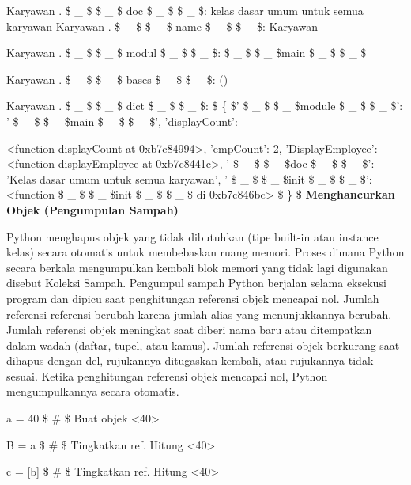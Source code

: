 \begin{12pt}
\begin{12pt}
\begin{12pt}
\begin{12pt}
\begin{12pt}
\begin{12pt}
\begin{12pt}
\begin{12pt}
\begin{12pt}
\begin{12pt}
\begin{12pt}
\begin{12pt}
\begin{12pt}
\begin{12pt}
\begin{12pt}
\begin{12pt}
\vspace{12pt}
\noindent 
Karyawan . \$  \_  \$ \$  \_  \$ doc \$  \_  \$ \$  \_  \$: kelas dasar umum untuk semua karyawan 
\noindent 
Karyawan . \$  \_  \$ \$  \_  \$ name \$  \_  \$ \$  \_  \$: Karyawan \par
\noindent 
Karyawan . \$  \_  \$ \$  \_  \$ modul \$  \_  \$ \$  \_  \$:  \$  \_  \$ \$  \_  \$main \$  \_  \$ \$  \_  \$ \par
\noindent 
Karyawan . \$  \_  \$ \$  \_  \$ bases \$  \_  \$ \$  \_  \$: () \par
\noindent 
Karyawan . \$  \_  \$ \$  \_  \$ dict \$  \_  \$ \$  \_  \$:  \$  \{  \$' \$  \_  \$ \$  \_  \$module \$  \_  \$ \$  \_  \$': ' \$  \_  \$ \$  \_  \$main \$  \_  \$ \$  \_  \$', 'displayCount': \par
\noindent 
<function displayCount at 0xb7c84994>, 'empCount': 2, 
\noindent 
'DisplayEmployee': <function displayEmployee at 0xb7c8441c>, 
\noindent 
' \$  \_  \$ \$  \_  \$doc \$  \_  \$ \$  \_  \$': 'Kelas dasar umum untuk semua karyawan', 
\noindent 
' \$  \_  \$ \$  \_  \$init \$  \_  \$ \$  \_  \$': <function  \$  \_  \$ \$  \_  \$init \$  \_  \$ \$  \_  \$ di 0xb7c846bc> \$  \}  \$ 
\vspace{12pt}
\noindent 
{\fontsize{14pt}{14pt}\selectfont \textbf{Menghancurkan Objek (Pengumpulan Sampah)} \\} \par
\vspace{12pt}
Python menghapus objek yang tidak dibutuhkan (tipe built-in atau instance kelas) secara otomatis untuk membebaskan ruang memori. Proses dimana Python secara berkala mengumpulkan kembali blok memori yang tidak lagi digunakan disebut Koleksi Sampah. Pengumpul sampah Python berjalan selama eksekusi program dan dipicu saat penghitungan referensi objek mencapai nol. Jumlah referensi referensi berubah karena jumlah alias yang menunjukkannya berubah. Jumlah referensi objek meningkat saat diberi nama baru atau ditempatkan dalam wadah (daftar, tupel, atau kamus). Jumlah referensi objek berkurang saat dihapus dengan del, rujukannya ditugaskan kembali, atau rujukannya tidak sesuai. Ketika penghitungan referensi objek mencapai nol, Python mengumpulkannya secara otomatis. \par
\vspace{12pt}
\noindent 
a = 40  \$  \#  \$ Buat objek <40> \par
\noindent 
B = a  \$  \#  \$ Tingkatkan ref. Hitung <40> \par
\noindent 
c = [b]  \$  \#  \$ Tingkatkan ref. Hitung <40> \par

\end{12pt}
\end{12pt}
\end{12pt}
\end{12pt}
\end{12pt}
\end{12pt}
\end{12pt}
\end{12pt}
\end{12pt}
\end{12pt}
\end{12pt}
\end{12pt}
\end{12pt}
\end{12pt}
\end{12pt}
\end{12pt}
